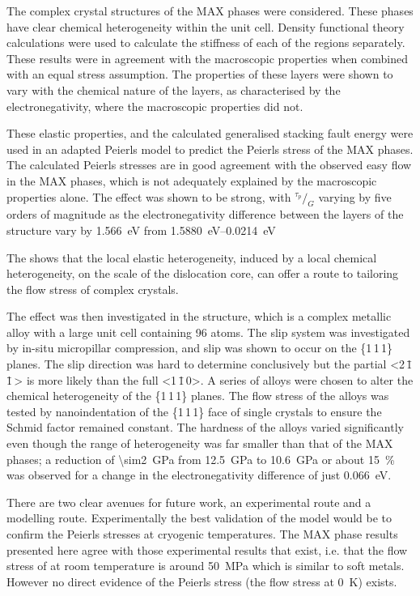 The complex crystal structures of the MAX phases were considered. These phases have clear chemical heterogeneity within the unit cell. Density functional theory calculations were used to calculate the stiffness of each of the regions separately. These results were in agreement with the macroscopic properties when combined with an equal stress assumption. The properties of these layers were shown to vary with the chemical nature of the layers, as characterised by the electronegativity, where the macroscopic properties did not.

These elastic properties, and the calculated generalised stacking fault energy were used in an adapted Peierls model to predict the Peierls stress of the MAX phases. The calculated Peierls stresses are in good agreement with the observed easy flow in the MAX phases, which is not adequately explained by the macroscopic properties alone. The effect was shown to be strong, with $^{\tau_p}\!/_{G}$ varying by five orders of magnitude as the electronegativity difference between the layers of the structure vary by \SI{1.566}{\electronvolt} from \SIrange{1.5880}{0.0214}{\electronvolt}

The shows that the local elastic heterogeneity, induced by a local chemical heterogeneity, on the scale of the dislocation core, can offer a route to tailoring the flow stress of complex crystals.

The effect was then investigated in the  structure, which is a complex metallic alloy with a large unit cell containing 96 atoms. The slip system was investigated by in-situ micropillar compression, and slip was shown to occur on the \{1\,1\,1\} planes. The slip direction was hard to determine conclusively but the partial <2\,\={1}\,\={1}\,> is more likely than the full <1\,\={1}\,0>. A series of alloys were chosen to alter the chemical heterogeneity of the  \{1\,1\,1\} planes. The flow stress of the alloys was tested by nanoindentation of the \{1\,1\,1\} face of single crystals to ensure the Schmid factor remained constant. The hardness of the alloys varied significantly even though the range of heterogeneity was far smaller than that of the MAX phases; a reduction of \SI{\sim2}{\giga\pascal} from \SI{12.5}{\giga\pascal} to \SI{10.6}{\giga\pascal} or about \SI{15}{\percent} was observed for a change in the electronegativity difference of just \SI{0.066}{\electronvolt}.



There are two clear avenues for future work, an experimental route and a modelling route. Experimentally the best validation of the model would be to confirm the Peierls stresses at cryogenic temperatures. The MAX phase results presented here agree with those experimental results that exist, i.e. that the flow stress of  at room temperature is around \SI{50}{\mega\pascal} which is similar to soft metals. However no direct evidence of the Peierls stress (the flow stress at \SI{0}{\kelvin}) exists.

